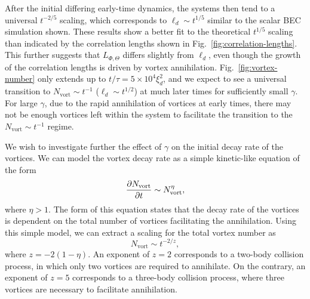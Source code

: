 After the initial differing early-time dynamics, the systems then tend to a
universal \(t^{-2/5}\) scaling, which corresponds to \(\ell_d\sim t^{1/5}\)
similar to the scalar BEC simulation shown.
These results show a better fit to the theoretical \(t^{1/5}\) scaling than
indicated by the correlation lengths shown in
Fig.~\ref{fig:correlation-lengths}.
This further suggests that \(L_{\Phi,\Theta}\) differs slightly from \(\ell_d\),
even though the growth of the correlation lengths is driven by vortex
annihilation.
Fig.~\ref{fig:vortex-number} only extends up to \(t/\tau=5\times 10^4\xi_d^2\),
and we expect to see a universal transition to
\(N_\mathrm{vort}\sim t^{-1}\) (\(\ell_d\sim t^{1/2}\)) at much later times for
sufficiently small \(\gamma \).
For large \(\gamma \), due to the rapid annihilation of vortices at early times,
there may not be enough vortices left within the system to facilitate the
transition to the \(N_\mathrm{vort} \sim t^{-1}\) regime.
\par
We wish to investigate further the effect of \(\gamma \) on the initial decay
rate of the vortices.
We can model the vortex decay rate as a simple kinetic-like equation of the form
\begin{equation}
    \pdv{N_\mathrm{vort}}{t} \sim N_\mathrm{vort}^\eta,
\end{equation}
where \(\eta > 1\).
The form of this equation states that the decay rate of the vortices is
dependent on the total number of vortices facilitating the annihilation.
Using this simple model, we can extract a scaling for the total vortex
number as
\begin{equation}
    N_\mathrm{vort} \sim t^{-2/z},
    \label{eq:vortex-number-scaling}
\end{equation}
where \(z=-2(1-\eta)\).
An exponent of \(z=2\) corresponds to a two-body collision process, in which
only two vortices are required to annihilate.
On the contrary, an exponent of \(z=5\) corresponds to a three-body collision
process, where three vortices are necessary to facilitate annihilation.

